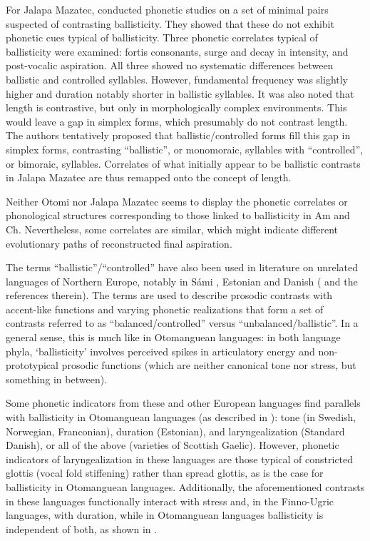 \documentclass[output=paper]{langscibook}
\begin{document}
For Jalapa Mazatec, \citet{SilvermanEtAl1995} conducted phonetic studies on a set of minimal pairs suspected of contrasting ballisticity. They showed that these do not exhibit phonetic cues typical of ballisticity. Three phonetic correlates typical of ballisticity were examined: fortis consonants, surge and decay in intensity, and post-vocalic aspiration. All three showed no systematic differences between ballistic and controlled syllables. However, fundamental frequency was slightly higher and duration notably shorter in ballistic syllables. It was also noted that length is contrastive, but only in morphologically complex environments. This would leave a gap in simplex forms, which presumably do not contrast length. The authors tentatively proposed that ballistic/controlled forms fill this gap in simplex forms, contrasting ``ballistic'', or monomoraic, syllables with ``controlled'', or bimoraic, syllables. Correlates of what initially appear to be ballistic contrasts in Jalapa Mazatec are thus remapped onto the concept of length.

Neither Otomi nor Jalapa Mazatec seems to display the phonetic correlates or phonological structures corresponding to those linked to ballisticity in Am and Ch. Nevertheless, some correlates are similar, which might indicate different evolutionary paths of reconstructed final aspiration. 

The terms ``ballistic''/``controlled'' have also been used in literature on unrelated languages of Northern Europe, notably in Sámi \citep{Harms1975}, Estonian and Danish (\citealt{Kuznetsova2018} and the references therein). The terms are used to describe prosodic contrasts with accent-like functions and varying phonetic realizations that form a set of contrasts referred to as “balanced/controlled” versus “unbalanced/ballistic”. In a general sense, this is much like in Otomanguean languages: in both language phyla, ‘ballisticity’ involves perceived spikes in articulatory energy and non-prototypical prosodic functions (which are neither canonical tone nor stress, but something in between).

Some phonetic indicators from these and other European languages find parallels with ballisticity in Otomanguean languages (as described in \citealt{Morrison2019}): tone (in Swedish, Norwegian, Franconian), duration (Estonian), and laryngealization (Standard Danish), or all of the above (varieties of Scottish Gaelic). However, phonetic indicators of laryngealization in these languages are those typical of constricted glottis (vocal fold stiffening) rather than spread glottis, as is the case for ballisticity in Otomanguean languages. Additionally, the aforementioned contrasts in these languages functionally interact with stress and, in the Finno-Ugric languages, with duration, while in Otomanguean languages ballisticity is independent of both, as shown in .
\end{document}
